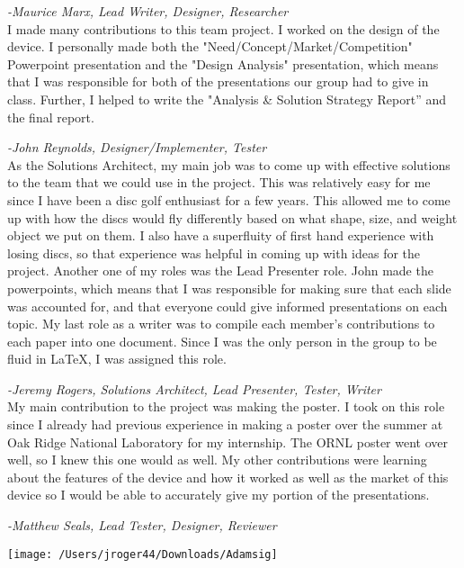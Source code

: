 \documentclass[12pt]{article}
\begin{document}
		\emph{-Maurice Marx,
			Lead Writer,
			Designer,
			Researcher} \\
		
		I made many contributions to this team project. I worked on the design of the device. I personally made both the "Need/Concept/Market/Competition" Powerpoint presentation and the "Design Analysis" presentation, which means that I was responsible for both of the presentations our group had to give in class. Further, I helped to write the "Analysis \& Solution Strategy Report” and the final report.
		
		\emph{-John Reynolds,
			Designer/Implementer,
			Tester} \\
		
		As the Solutions Architect, my main job was to come up with effective solutions to the team that we could use in the project. This was relatively easy for me since I have been a disc golf enthusiast for a few years. This allowed me to come up with how the discs would fly differently based on what shape, size, and weight object we put on them. I also have a superfluity of first hand experience with losing discs, so that experience was helpful in coming up with ideas for the project. Another one of my roles was the Lead Presenter role. John made the powerpoints, which means that I was responsible for making sure that each slide was accounted for, and that everyone could give informed presentations on each topic. My last role as a writer was to compile each member's contributions to each paper into one document. Since I was the only person in the group to be fluid in \LaTeX, I was assigned this role. 
		
		\emph{-Jeremy Rogers,
			Solutions Architect,
			Lead Presenter,
			Tester,
			Writer} \\
		
		My main contribution to the project was making the poster. I took on this role since I already had previous experience in making a poster over the summer at Oak Ridge National Laboratory for my internship. The ORNL poster went over well, so I knew this one would as well. My other contributions were learning about the features of the device and how it worked as well as the market of this device so I would be able to accurately give my portion of the presentations.
		
		\emph{-Matthew Seals,
			Lead Tester,
			Designer,
			Reviewer}
		
		\pagebreak
		
		\texttt{[image: /Users/jroger44/Downloads/Adamsig]}
\end{document}

